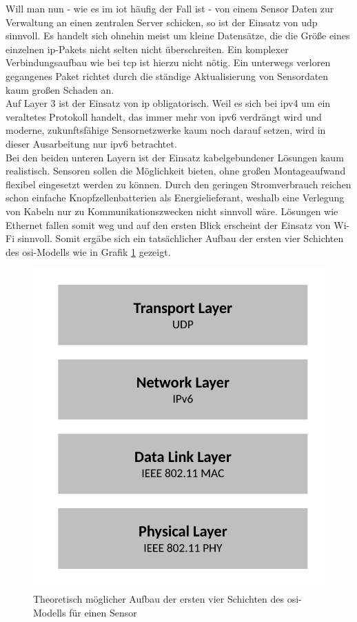 Will man nun - wie es im \ac{iot} häufig der Fall ist - von einem Sensor Daten zur Verwaltung an einen zentralen Server schicken, so ist der Einsatz von \ac{udp} sinnvoll. Es handelt sich ohnehin meist um kleine Datensätze, die die Größe eines einzelnen \ac{ip}-Pakets nicht selten nicht überschreiten. Ein komplexer Verbindungsaufbau wie bei \ac{tcp} ist hierzu nicht nötig. Ein unterwegs verloren gegangenes Paket richtet durch die ständige Aktualisierung von Sensordaten kaum großen Schaden an.\\
Auf Layer 3 ist der Einsatz von \ac{ip} obligatorisch. Weil es sich bei \ac{ipv4} um ein veraltetes Protokoll handelt, das immer mehr von \ac{ipv6} verdrängt wird und moderne, zukunftsfähige Sensornetzwerke kaum noch darauf setzen, wird in dieser Ausarbeitung nur \ac{ipv6} betrachtet.\\
Bei den beiden unteren Layern ist der Einsatz kabelgebundener Lösungen kaum realistisch. Sensoren sollen die Möglichkeit bieten, ohne großen Montageaufwand flexibel eingesetzt werden zu können. Durch den geringen Stromverbrauch reichen schon einfache Knopfzellenbatterien als Energielieferant, weshalb eine Verlegung von Kabeln nur zu Kommunikationszwecken nicht sinnvoll wäre. Lösungen wie Ethernet fallen somit weg und auf den ersten Blick erscheint der Einsatz von Wi-Fi sinnvoll. Somit ergäbe sich ein tatsächlicher Aufbau der ersten vier Schichten des \ac{osi}-Modells wie in Grafik \ref{sensor-osi} gezeigt.
\begin{figure}
	\centering
	\includegraphics[width=\textwidth/2]{Grafiken-Alex/sensor-osi.pdf}
	\caption{Theoretisch möglicher Aufbau der ersten vier Schichten des \ac{osi}-Modells für einen Sensor}
	\label{sensor-osi}
\end{figure}
